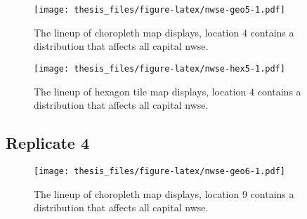 \documentclass{monashthesis}
\begin{document}
\begin{figure}
\centering
\texttt{[image: thesis\_files/figure-latex/nwse-geo5-1.pdf]}
\caption{\label{fig:nwse-geo5}The lineup of choropleth map displays, location 4 contains a distribution that affects all capital nwse.}
\end{figure}

\begin{Shaded}
\begin{Highlighting}[]
\NormalTok{() }\OperatorTok{+}
\StringTok{  }\NormalTok{(}\NormalTok{(}\NormalTok{(}\NormalTok{)))}
\end{Highlighting}
\end{Shaded}

\begin{figure}
\centering
\texttt{[image: thesis\_files/figure-latex/nwse-hex5-1.pdf]}
\caption{\label{fig:nwse-hex5}The lineup of hexagon tile map displays, location 4 contains a distribution that affects all capital nwse.}
\end{figure}

\hypertarget{replicate-4-2}{%
\subsection{Replicate 4}\label{replicate-4-2}}

\begin{Shaded}
\begin{Highlighting}[]
\NormalTok{() }\OperatorTok{+}
\StringTok{  }\NormalTok{(}\NormalTok{(}\NormalTok{(}\NormalTok{)))}
\end{Highlighting}
\end{Shaded}

\begin{figure}
\centering
\texttt{[image: thesis\_files/figure-latex/nwse-geo6-1.pdf]}
\caption{\label{fig:nwse-geo6}The lineup of choropleth map displays, location 9 contains a distribution that affects all capital nwse.}
\end{figure}

\begin{Shaded}
\begin{Highlighting}[]
\NormalTok{() }\OperatorTok{+}
\StringTok{  }\NormalTok{(}\NormalTok{(}\NormalTok{(}\NormalTok{)))}
\end{Highlighting}
\end{Shaded}
\end{document}
